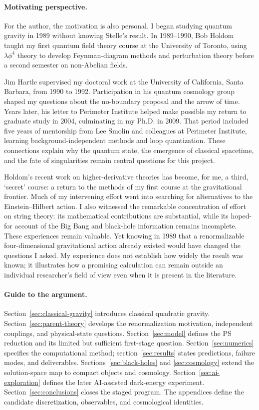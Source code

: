 \paragraph*{Motivating perspective.}
For the author, the motivation is also personal.  I began studying quantum gravity in 1989 without knowing Stelle's result.  In 1989--1990, Bob Holdom taught my first quantum field theory course at the University of Toronto, using $\lambda\phi^4$ theory to develop Feynman-diagram methods and perturbation theory before a second semester on non-Abelian fields.

Jim Hartle supervised my doctoral work at the University of California, Santa Barbara, from 1990 to 1992.  Participation in his quantum cosmology group shaped my questions about the no-boundary proposal and the arrow of time.  Years later, his letter to Perimeter Institute helped make possible my return to graduate study in 2004, culminating in my Ph.D. in 2009.  That period included five years of mentorship from Lee Smolin and colleagues at Perimeter Institute, learning background-independent methods and loop quantization.  These connections explain why the quantum state, the emergence of classical spacetime, and the fate of singularities remain central questions for this project.

Holdom's recent work on higher-derivative theories has become, for me, a third, `secret' course: a return to the methods of my first course at the gravitational frontier.  Much of my intervening effort went into searching for alternatives to the Einstein--Hilbert action.  I also witnessed the remarkable concentration of effort on string theory: its mathematical contributions are substantial, while its hoped-for account of the Big Bang and black-hole information remains incomplete.  These experiences remain valuable.  Yet knowing in 1989 that a renormalizable four-dimensional gravitational action already existed would have changed the questions I asked.  My experience does not establish how widely the result was known; it illustrates how a promising calculation can remain outside an individual researcher's field of view even when it is present in the literature.

\paragraph*{Guide to the argument.}
Section~\ref{sec:classical-gravity} introduces classical quadratic gravity.  Section~\ref{sec:parent-theory} develops the renormalization motivation, independent couplings, and physical-state questions.  Section~\ref{sec:model} defines the PS reduction and its limited but sufficient first-stage question.  Section~\ref{sec:numerics} specifies the computational method; section~\ref{sec:results} states predictions, failure modes, and deliverables.  Sections~\ref{sec:black-holes} and \ref{sec:cosmology} extend the solution-space map to compact objects and cosmology.  Section~\ref{sec:ai-exploration} defines the later AI-assisted dark-energy experiment.  Section~\ref{sec:conclusions} closes the staged program.  The appendices define the candidate discretization, observables, and cosmological identities.
